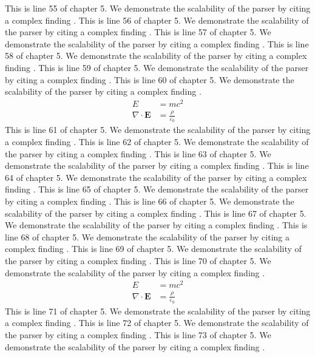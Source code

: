 This is line 55 of chapter 5. We demonstrate the scalability of the parser by citing a complex finding \cite{ref5_55}.
This is line 56 of chapter 5. We demonstrate the scalability of the parser by citing a complex finding \cite{ref5_56}.
This is line 57 of chapter 5. We demonstrate the scalability of the parser by citing a complex finding \cite{ref5_57}.
This is line 58 of chapter 5. We demonstrate the scalability of the parser by citing a complex finding \cite{ref5_58}.
This is line 59 of chapter 5. We demonstrate the scalability of the parser by citing a complex finding \cite{ref5_59}.
This is line 60 of chapter 5. We demonstrate the scalability of the parser by citing a complex finding \cite{ref5_60}.
\begin{align*}
  E &= mc^2 \\
  \nabla \cdot \mathbf{E} &= \frac{\rho}{\varepsilon_0}
\end{align*}
This is line 61 of chapter 5. We demonstrate the scalability of the parser by citing a complex finding \cite{ref5_61}.
This is line 62 of chapter 5. We demonstrate the scalability of the parser by citing a complex finding \cite{ref5_62}.
This is line 63 of chapter 5. We demonstrate the scalability of the parser by citing a complex finding \cite{ref5_63}.
This is line 64 of chapter 5. We demonstrate the scalability of the parser by citing a complex finding \cite{ref5_64}.
This is line 65 of chapter 5. We demonstrate the scalability of the parser by citing a complex finding \cite{ref5_65}.
This is line 66 of chapter 5. We demonstrate the scalability of the parser by citing a complex finding \cite{ref5_66}.
This is line 67 of chapter 5. We demonstrate the scalability of the parser by citing a complex finding \cite{ref5_67}.
This is line 68 of chapter 5. We demonstrate the scalability of the parser by citing a complex finding \cite{ref5_68}.
This is line 69 of chapter 5. We demonstrate the scalability of the parser by citing a complex finding \cite{ref5_69}.
This is line 70 of chapter 5. We demonstrate the scalability of the parser by citing a complex finding \cite{ref5_70}.
\begin{align*}
  E &= mc^2 \\
  \nabla \cdot \mathbf{E} &= \frac{\rho}{\varepsilon_0}
\end{align*}
This is line 71 of chapter 5. We demonstrate the scalability of the parser by citing a complex finding \cite{ref5_71}.
This is line 72 of chapter 5. We demonstrate the scalability of the parser by citing a complex finding \cite{ref5_72}.
This is line 73 of chapter 5. We demonstrate the scalability of the parser by citing a complex finding \cite{ref5_73}.
